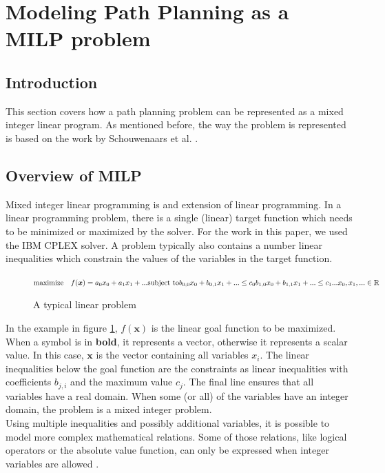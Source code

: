

\section{Modeling Path Planning as a MILP problem}
\subsection{Introduction}
This section covers how a path planning problem can be represented as a mixed integer linear program. As mentioned before, the way the problem is represented is based on the work by Schouwenaars et al. \cite{Schouwenaars2001}.
\subsection{Overview of MILP}
\label{subsec:previous}
Mixed integer linear programming is and extension of linear programming. In a linear programming problem, there is a single (linear) target function which needs to be minimized or maximized by the solver. For the work in this paper, we used the IBM CPLEX solver. A problem typically also contains a number linear inequalities which constrain the values of the variables in the target function. \\
\begin{figure}
\begin{math}
\text{maximize} \quad f(\boldsymbol{x}) = a_0 x_0 + a_1 x_1 + ...\\
\text{subject to} \\
b_{0,0} x_0 + b_{0,1} x_1 + ...\leq c_0 \\
b_{1,0} x_0 + b_{1,1} x_1 + ...\leq c_1 \\
... \\
x_0, x_1, ... \in \mathbb{R}
\end{math}
\caption{A typical linear problem}
\label{fig:example-lp}
\end{figure}
In the example in figure \ref{fig:example-lp}, $  f(\boldsymbol{x}) $ is the linear goal function to be maximized. When a symbol is in \textbf{bold}, it represents a vector, otherwise it represents a scalar value. In this case, $\boldsymbol{x}$ is the vector containing all variables $x_i$. The linear inequalities below the goal function are the constraints as linear inequalities with coefficients $b_{j,i}$ and the maximum value $c_j$. The final line ensures that all variables have a real domain. When some (or all) of the variables have an integer domain, the problem is a mixed integer problem. \\
Using multiple inequalities and possibly additional variables, it is possible to model more complex mathematical relations. Some of those relations, like logical operators or the absolute value function, can only be expressed when integer variables are allowed \cite{Mitra1994}. 
